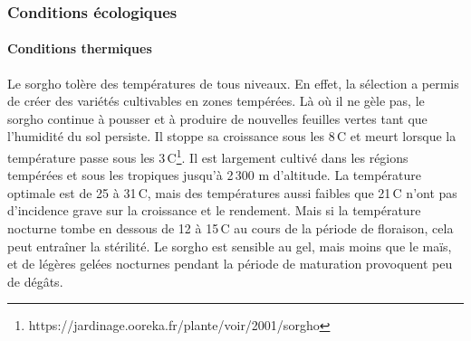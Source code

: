 \documentclass[a4paper,11pt]{article}
\begin{document}
\subsubsection{Conditions écologiques}

\paragraph{Conditions thermiques} Le sorgho tolère des températures de
tous niveaux. En effet, la sélection a permis de créer des variétés
cultivables en zones tempérées. Là où il ne gèle pas, le sorgho
continue à pousser et à produire de nouvelles feuilles vertes tant que
l’humidité du sol persiste. Il stoppe sa croissance sous les
8\,\degree{}C et meurt lorsque la température passe sous les
3\,\degree{}C\footnote{https://jardinage.ooreka.fr/plante/voir/2001/sorgho}. Il
est largement cultivé dans les régions tempérées et sous les tropiques
jusqu’à 2\,300 m d’altitude. La température optimale est de 25 à
31\,\degree{}C, mais des températures aussi faibles que 21\,\degree{}C
n’ont pas d’incidence grave sur la croissance et le rendement. Mais si
la température nocturne tombe en dessous de 12 à 15\,\degree{}C au
cours de la période de floraison, cela peut entraîner la stérilité. Le
sorgho est sensible au gel, mais moins que le maïs, et de légères
gelées nocturnes pendant la période de maturation provoquent peu de
dégâts\cite{BARRO_KONDOMBO_2010}.
\end{document}
